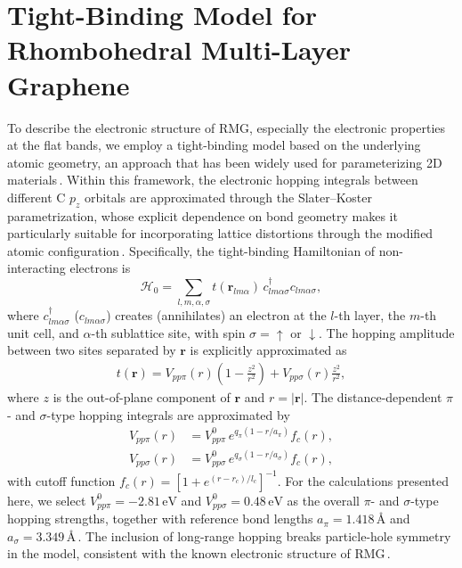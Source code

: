 \documentclass[aps,prx,article,twocolumn,amsmath,amssymb,superscriptaddress,longbibliography]{revtex4-2}
\begin{document}
\section{Tight-Binding Model for Rhombohedral Multi-Layer Graphene}\label{sec:tightBinding}

To describe the electronic structure of RMG, especially the electronic properties at the flat bands, we employ a tight-binding model based on the underlying atomic geometry, an approach that has been widely used for parameterizing 2D materials\,\cite{fang2015ab,koshino2018maximally,miao2023truncated, vafek2023continuum}. Within this framework, the electronic hopping integrals between different C $p_z$ orbitals are approximated through the Slater--Koster parametrization, whose explicit dependence on bond geometry makes it particularly suitable for incorporating lattice distortions through the modified atomic configuration\,\cite{slater1954simplified}. Specifically, the tight-binding Hamiltonian of non-interacting electrons is
\begin{equation}\label{eq:nonintHam}
\mathcal{H}_0=\sum_{l,m,\alpha,\sigma}t(\mathbf{r}_{lm\alpha})\, c^\dagger_{lm\alpha\sigma}c_{lm\alpha\sigma},
\end{equation}
where $c^\dagger_{lm\alpha\sigma}$ ($c_{lm\alpha\sigma}$) creates (annihilates) an electron at the $l$-th layer, the $m$-th unit cell, and $\alpha$-th sublattice site, with spin $\sigma=\uparrow$ or $\downarrow$. The hopping amplitude between two sites separated by $\mathbf{r}$ is explicitly approximated as
\begin{align}
   t(\mathbf{r}) = V_{pp\pi}(r)\left(1-\frac{z^2}{r^2}\right) + V_{pp\sigma}(r)\frac{z^2}{r^2}, 
\end{align}
where $z$ is the out-of-plane component of $\mathbf{r}$ and $r = |\mathbf{r}|$. The distance-dependent $\pi$- and $\sigma$-type hopping integrals are approximated by
\begin{align}
V_{pp\pi}(r) &= V_{pp\pi}^0 \, e^{q_\pi (1 - r/a_\pi)} f_c(r),\\
V_{pp\sigma}(r) &= V_{pp\sigma}^0 \, e^{q_\sigma (1 - r/a_\sigma)} f_c(r),
\end{align}
with cutoff function $f_c(r) = \left[1 + e^{(r - r_c)/l_c}\right]^{-1}.$
For the calculations presented here, we select $V_{pp\pi}^0 = -2.81\,\mathrm{eV}$ and $V_{pp\sigma}^0 = 0.48\,\mathrm{eV}$ as the overall $\pi$- and $\sigma$-type hopping strengths, together with reference bond lengths $a_\pi = 1.418\,\text{\AA}$ and $a_\sigma = 3.349\,\text{\AA}$\,\cite{herzogarbeitman2024moire}. The inclusion of long-range hopping breaks particle-hole symmetry in the model, consistent with the known electronic structure of RMG\,\cite{huang2023spin, koh2024correlated, herzogarbeitman2024moire, wolf2024magnetism, parramartinez2025nematic}.
\end{document}
